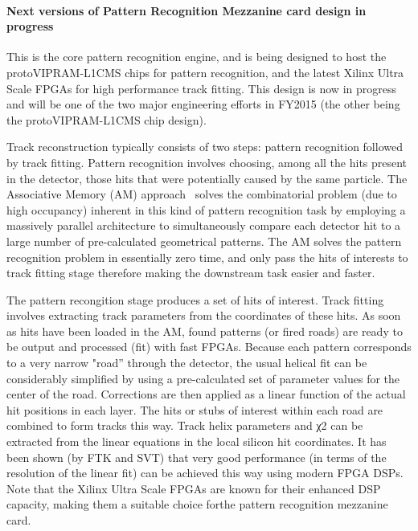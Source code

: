 \paragraph{Next versions of Pattern Recognition Mezzanine card design in progress}

This is the core pattern recognition engine, and is being designed to host the protoVIPRAM-L1CMS chips for pattern recognition, and the latest Xilinx Ultra Scale FPGAs for high performance track fitting. This design is now in progress and will be one of the two major engineering efforts in FY2015 (the other being the protoVIPRAM-L1CMS chip design). 

Track reconstruction typically consists of two steps: pattern recognition followed by track fitting. Pattern recognition involves choosing, among all the hits present in the detector, those hits that were potentially caused by the same particle. The Associative Memory (AM) approach~\cite{bib:Rist-89} solves the combinatorial problem (due to high occupancy) inherent in this kind of pattern recognition task by employing a massively parallel architecture to simultaneously compare each detector hit to a large number of pre-calculated geometrical patterns. The AM solves the pattern recognition problem in essentially zero time, and only pass the hits of interests to track fitting stage therefore making the downstream task easier and faster.

The pattern recongition stage produces a set of hits of interest. Track fitting involves extracting track parameters from the
coordinates of these hits.  As soon as hits have been loaded in the AM, found patterns (or fired roads) are ready to be output and processed (fit) with fast FPGAs. Because each pattern corresponds to a very narrow "road” through the detector, the usual helical fit can be considerably simplified by using a pre-calculated set of parameter values for the center of the road.  Corrections are then applied as a linear function of the actual hit positions in each layer. The hits or stubs of interest within each road are combined to form tracks this way. Track helix parameters and χ2 can be extracted from the linear equations in the local silicon hit coordinates. It has been shown (by FTK and SVT) that very good performance (in terms of the resolution of the linear fit) can be achieved this way using modern FPGA DSPs. Note that the Xilinx Ultra Scale FPGAs are known for their enhanced DSP capacity, making them a suitable choice forthe pattern recognition mezzanine card.

